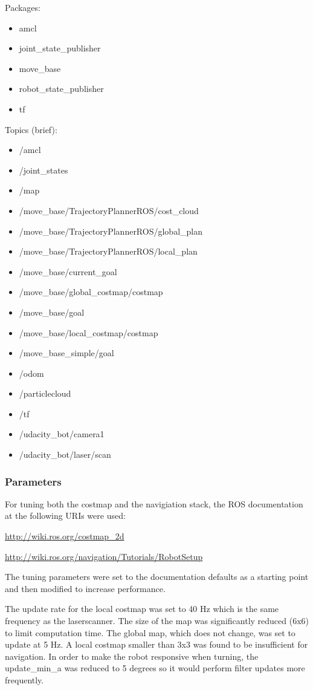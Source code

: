 \documentclass[10pt,journal,compsoc]{IEEEtran}
\begin{document}
Packages:
\begin{itemize}
\item amcl
\item joint\_state\_publisher
\item move\_base
\item robot\_state\_publisher
\item tf
\end {itemize}
Topics (brief):
\begin{itemize}
\item /amcl
\item /joint\_states
\item /map
\item /move\_base/TrajectoryPlannerROS/cost\_cloud
\item /move\_base/TrajectoryPlannerROS/global\_plan
\item /move\_base/TrajectoryPlannerROS/local\_plan
\item /move\_base/current\_goal
\item /move\_base/global\_costmap/costmap
\item /move\_base/goal
\item /move\_base/local\_costmap/costmap
\item /move\_base\_simple/goal
\item /odom
\item /particlecloud
\item /tf
\item /udacity\_bot/camera1
\item /udacity\_bot/laser/scan
\end {itemize}

\subsubsection{Parameters}
For tuning both the costmap and the navigiation stack, the ROS documentation at the following URIs were used:

\url{http://wiki.ros.org/costmap\_2d}

\url{http://wiki.ros.org/navigation/Tutorials/RobotSetup}

The tuning parameters were set to the documentation defaults as a starting point and then modified to increase performance.

The update rate for the local costmap was set to 40 Hz which is the same frequency as the laserscanner. The size of the map was significantly reduced (6x6) to limit computation time. The global map, which does not change, was set to update at 5 Hz. A local costmap smaller than 3x3 was found to be insufficient for navigation. In order to make the robot responsive when turning, the update\_min\_a was reduced to 5 degrees so it would perform filter updates more frequently.
\end{document}
